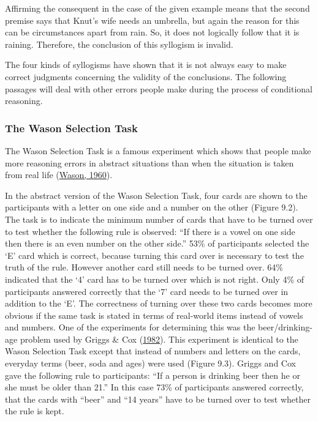 \documentclass[
]{krantz}
\begin{document}
Affirming the consequent in the case of the given example means that the second premise says that Knut's wife needs an umbrella, but again the reason for this can be circumstances apart from rain. So, it does not logically follow that it is raining. Therefore, the conclusion of this syllogism is invalid.

The four kinds of syllogisms have shown that it is not always easy to make correct judgments concerning the validity of the conclusions. The following passages will deal with other errors people make during the process of conditional reasoning.

\hypertarget{the-wason-selection-task}{%
\subsubsection*{The Wason Selection Task}\label{the-wason-selection-task}}


The Wason Selection Task is a famous experiment which shows that people make more reasoning errors in abstract situations than when the situation is taken from real life (\protect\hyperlink{ref-Wason1960}{Wason, 1960}).

In the abstract version of the Wason Selection Task, four cards are shown to the participants with a letter on one side and a number on the other (Figure 9.2). The task is to indicate the minimum number of cards that have to be turned over to test whether the following rule is observed: ``If there is a vowel on one side then there is an even number on the other side.'' 53\% of participants selected the `E' card which is correct, because turning this card over is necessary to test the truth of the rule. However another card still needs to be turned over. 64\% indicated that the `4' card has to be turned over which is not right. Only 4\% of participants answered correctly that the `7' card needs to be turned over in addition to the `E'. The correctness of turning over these two cards becomes more obvious if the same task is stated in terms of real-world items instead of vowels and numbers. One of the experiments for determining this was the beer/drinking-age problem used by Griggs \& Cox (\protect\hyperlink{ref-griggs1982elusive}{1982}). This experiment is identical to the Wason Selection Task except that instead of numbers and letters on the cards, everyday terms (beer, soda and ages) were used (Figure 9.3). Griggs and Cox gave the following rule to participants: ``If a person is drinking beer then he or she must be older than 21.'' In this case 73\% of participants answered correctly, that the cards with ``beer'' and ``14 years'' have to be turned over to test whether the rule is kept.
\end{document}
